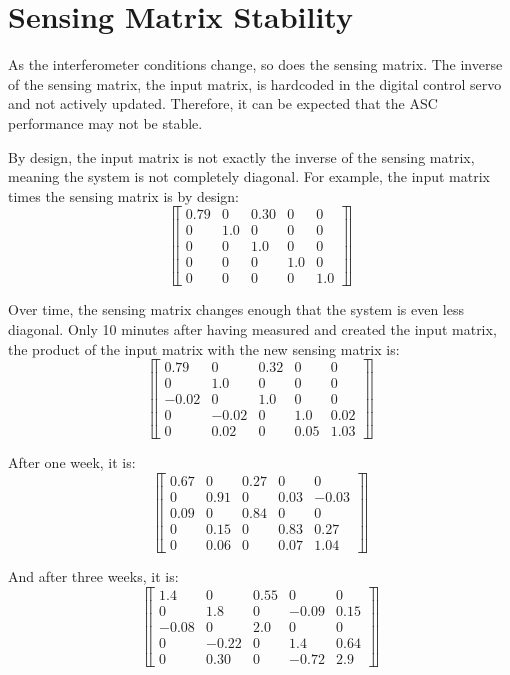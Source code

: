 \section{Sensing Matrix Stability}

As the interferometer conditions change, so does the sensing
matrix. The inverse of the sensing matrix, the input matrix, is
hardcoded in the digital control servo and not actively
updated. Therefore, it can be expected that the ASC performance may
not be stable. 

By design, the input matrix is not exactly the inverse of the sensing
matrix, meaning the system is not completely diagonal. For example,
the input matrix times the sensing matrix is by design:
 \[ \left\llbracket \begin{array}{ccccc}
0.79 & 0 & 0.30 & 0 & 0 \\
0 & 1.0 & 0 & 0 & 0 \\
0 & 0 & 1.0 & 0 & 0 \\
0 & 0 & 0 & 1.0 & 0 \\
0 & 0 & 0 & 0 & 1.0 
\end{array} \right\rrbracket\] 

Over time, the sensing matrix changes enough that the system is even less 
diagonal. Only 10 minutes after having measured and created the input
matrix, the product of the input matrix with the new sensing matrix is:
\[ \left\llbracket \begin{array}{ccccc}
0.79 & 0 & 0.32 & 0 & 0 \\
0 & 1.0 & 0 & 0 & 0 \\
-0.02 & 0 & 1.0 & 0 & 0 \\
0 & -0.02 & 0 & 1.0 & 0.02 \\
0 & 0.02 & 0 & 0.05 & 1.03 
\end{array} \right\rrbracket\] 

After one week, it is:
 \[ \left\llbracket \begin{array}{ccccc}
0.67 & 0 & 0.27 & 0 & 0 \\
0 & 0.91 & 0 & 0.03 & -0.03 \\
0.09 & 0 & 0.84 & 0 & 0 \\
0 & 0.15 & 0 & 0.83 & 0.27 \\
0 & 0.06 & 0 & 0.07 & 1.04 
\end{array} \right\rrbracket\] 

And after three weeks, it is:
 \[ \left\llbracket \begin{array}{ccccc}
1.4 & 0 & 0.55 & 0 & 0 \\
0 & 1.8 & 0 & -0.09 & 0.15 \\
-0.08 & 0 & 2.0 & 0 & 0 \\
0 & -0.22 & 0 & 1.4 & 0.64 \\
0 & 0.30 & 0 & -0.72 & 2.9 
\end{array} \right\rrbracket\] 

